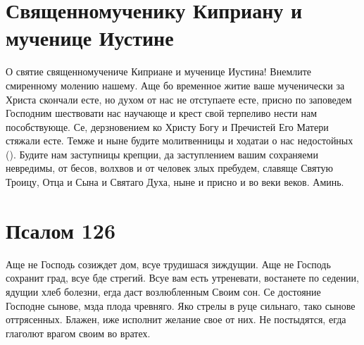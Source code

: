 \section{Священномученику Киприану и мученице Иустине}

\tolkopoblagosloveniyu

\begin{mymulticols}



 О святие священномучениче Киприане и мученице Иустина! Внемлите смиренному молению нашему. Аще бо временное житие ваше мученически за Христа скончали есте, но духом от нас не отступаете есте, присно по заповедем Господним шествовати нас научающе и крест свой терпеливо нести нам пособствующе. Се, дерзновением ко Христу Богу и Пречистей Его Матери стяжали есте. Темже и ныне будите молитвенницы и ходатаи о нас недостойных (). Будите нам заступницы крепции, да заступлением вашим сохраняеми невредимы, от бесов, волхвов и от человек злых пребудем, славяще Святую Троицу, Отца и Сына и Святаго Духа, ныне и присно и во веки веков. Аминь.


\end{mymulticols}

\newpage\section{Псалом 126}\begin{mymulticols}



Аще не Господь созиждет дом, всуе трудишася зиждущии. Аще не Господь сохранит град, всуе бде стрегий. Всуе вам есть утреневати, востанете по седении, ядущии хлеб болезни, егда даст возлюбленным Своим сон. Се достояние Господне сынове, мзда плода чревняго. Яко стрелы в руце сильнаго, тако сынове оттрясенных. Блажен, иже исполнит желание свое от них. Не постыдятся, егда глаголют врагом своим во вратех.


\end{mymulticols}

\mychapterending





